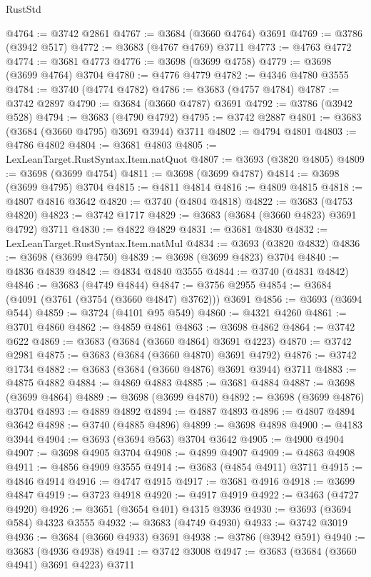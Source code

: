 \begin{lexlean}{RustStd}
\begin{coremodule}
{\begin{coremodule}
{{{{{{{{{{{{{{{{{{{{{{{{{{{{{{{{{{{{{{{{{{{{{{{@4764 := @3742 @2861
@4767 := @3684 (@3660 @4764) @3691
@4769 := @3786 (@3942 @517)
@4772 := @3683 (@4767 @4769) @3711
@4773 := @4763 @4772
@4774 := @3681 @4773
@4776 := @3698 (@3699 @4758)
@4779 := @3698 (@3699 @4764) @3704
@4780 := @4776 @4779
@4782 := @4346 @4780 @3555
@4784 := @3740 (@4774 @4782)
@4786 := @3683 (@4757 @4784)
@4787 := @3742 @2897
@4790 := @3684 (@3660 @4787) @3691
@4792 := @3786 (@3942 @528)
@4794 := @3683 (@4790 @4792)
@4795 := @3742 @2887
@4801 := @3683 (@3684 (@3660 @4795) @3691 @3944) @3711
@4802 := @4794 @4801
@4803 := @4786 @4802
@4804 := @3681 @4803
@4805 := LexLeanTarget.RustSyntax.Item.natQuot
@4807 := @3693 (@3820 @4805)
@4809 := @3698 (@3699 @4754)
@4811 := @3698 (@3699 @4787)
@4814 := @3698 (@3699 @4795) @3704
@4815 := @4811 @4814
@4816 := @4809 @4815
@4818 := @4807 @4816 @3642
@4820 := @3740 (@4804 @4818)
@4822 := @3683 (@4753 @4820)
@4823 := @3742 @1717
@4829 := @3683 (@3684 (@3660 @4823) @3691 @4792) @3711
@4830 := @4822 @4829
@4831 := @3681 @4830
@4832 := LexLeanTarget.RustSyntax.Item.natMul
@4834 := @3693 (@3820 @4832)
@4836 := @3698 (@3699 @4750)
@4839 := @3698 (@3699 @4823) @3704
@4840 := @4836 @4839
@4842 := @4834 @4840 @3555
@4844 := @3740 (@4831 @4842)
@4846 := @3683 (@4749 @4844)
@4847 := @3756 @2955
@4854 := @3684 (@4091 (@3761 (@3754 (@3660 @4847) @3762))) @3691
@4856 := @3693 (@3694 @544)
@4859 := @3724 (@4101 @95 @549)
@4860 := @4321 @4260
@4861 := @3701 @4860
@4862 := @4859 @4861
@4863 := @3698 @4862
@4864 := @3742 @622
@4869 := @3683 (@3684 (@3660 @4864) @3691 @4223)
@4870 := @3742 @2981
@4875 := @3683 (@3684 (@3660 @4870) @3691 @4792)
@4876 := @3742 @1734
@4882 := @3683 (@3684 (@3660 @4876) @3691 @3944) @3711
@4883 := @4875 @4882
@4884 := @4869 @4883
@4885 := @3681 @4884
@4887 := @3698 (@3699 @4864)
@4889 := @3698 (@3699 @4870)
@4892 := @3698 (@3699 @4876) @3704
@4893 := @4889 @4892
@4894 := @4887 @4893
@4896 := @4807 @4894 @3642
@4898 := @3740 (@4885 @4896)
@4899 := @3698 @4898
@4900 := @4183 @3944
@4904 := @3693 (@3694 @563) @3704 @3642
@4905 := @4900 @4904
@4907 := @3698 @4905 @3704
@4908 := @4899 @4907
@4909 := @4863 @4908
@4911 := @4856 @4909 @3555
@4914 := @3683 (@4854 @4911) @3711
@4915 := @4846 @4914
@4916 := @4747 @4915
@4917 := @3681 @4916
@4918 := @3699 @4847
@4919 := @3723 @4918
@4920 := @4917 @4919
@4922 := @3463 (@4727 @4920)
@4926 := @3651 (@3654 @401) @4315 @3936
@4930 := @3693 (@3694 @584) @4323 @3555
@4932 := @3683 (@4749 @4930)
@4933 := @3742 @3019
@4936 := @3684 (@3660 @4933) @3691
@4938 := @3786 (@3942 @591)
@4940 := @3683 (@4936 @4938)
@4941 := @3742 @3008
@4947 := @3683 (@3684 (@3660 @4941) @3691 @4223) @3711
}}}}}}}}}}}}}}}}}}}}}}}}}}}}}}}}}}}}}}}}}}}}}}}
\end{coremodule}}
\end{coremodule}
\end{lexlean}
